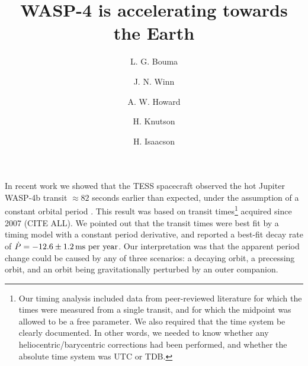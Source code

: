 \documentclass[RNAAS]{aastex62}
\begin{document}
\title{WASP-4 is accelerating towards the Earth}


\author[0000-0002-0514-5538]{L. G. Bouma}
%
\author[0000-0002-4265-047X]{J. N. Winn}
%
\author[0000-0001-8638-0320]{A. W. Howard}
%
\author{H. Knutson}
%
\author[0000-0002-0531-1073]{H. Isaacson}
%



\section{}

In recent work we showed that the TESS spacecraft observed the hot
Jupiter WASP-4b transit $\approx 82$ seconds earlier than expected,
under the assumption of a constant orbital period
\citep{bouma_wasp-4b_2019}.  This result was based on transit
times\footnote{ Our timing analysis included data from peer-reviewed
literature for which the times were measured from a single transit,
and for which the midpoint was allowed to be a free parameter. We also
required that the time system be clearly documented. In other words,
we needed to know
whether any heliocentric/barycentric corrections had been performed,
and whether the absolute time system was UTC or TDB.} acquired since
2007 (CITE ALL).  We pointed out that the transit times were best fit
by a timing model with a constant period derivative, and reported a
best-fit decay rate of $\dot{P} = -12.6 \pm 1.2\,{\rm ms\ per\ year}$.
Our interpretation was that the apparent period change could be caused
by any of three scenarios: a decaying orbit, a precessing orbit, and
an orbit being gravitationally perturbed by an outer companion.
\end{document}
